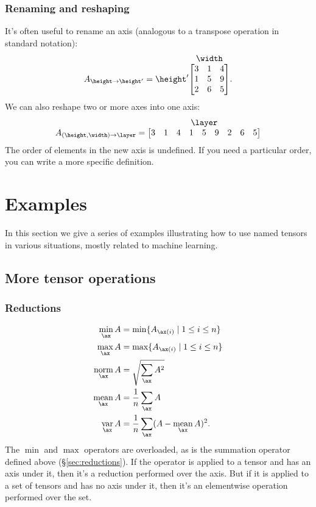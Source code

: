 \documentclass{article}
\makeatletter
\newcommand{\nmatrix}[3]{#1\begin{array}[b]{@{}c@{}}#2\\\begin{bmatrix}#3\end{bmatrix}\end{array}}
\makeatother
\begin{document}
\subsubsection{Renaming and reshaping}

It's often useful to rename an axis (analogous to a transpose operation in standard notation):
\begin{equation*}
A_{\height\rightarrow\height'} = \nmatrix{\height'}{\width}{
  3 & 1 & 4 \\
  1 & 5 & 9 \\
  2 & 6 & 5 \\
}.
\end{equation*}
We can also reshape two or more axes into one axis:
\begin{equation*}
  A_{(\height,\width)\rightarrow\layer} = \nmatrix{}{\layer}{
    3 & 1 & 4 & 1 & 5 & 9 & 2 & 6 & 5
  }
\end{equation*}
The order of elements in the new axis is undefined. If you need a particular order, you can write a more specific definition.

\section{Examples}
\label{sec:examples}

In this section we give a series of examples illustrating how to use named tensors in various situations, mostly related to machine learning.
\subsection{More tensor operations}

\subsubsection{Reductions}
\label{sec:morereductions}

\begin{align*}
  \nfun{\ax}{min} A &= \min \{A_{\ax(i)} \mid 1 \leq i \leq n\} \\
  \nfun{\ax}{max} A &= \max \{A_{\ax(i)} \mid 1 \leq i \leq n\} \\
  \nfun{\ax}{norm} A &= \sqrt{\nsum{\ax} A^2} \\
  \nfun{\ax}{mean} A &= \frac{1}{n} \nsum{\ax} A \\
  \nfun{\ax}{var} A &= \frac{1}{n} \nsum{\ax} (A - \nfun{\ax}{mean} A)^2.
\end{align*}
The $\min$ and $\max$ operators are overloaded, as is the summation operator defined above (\S\ref{sec:reductions}). If the operator is applied to a tensor and has an axis under it, then it's a reduction performed over the axis. But if it is applied to a set of tensors and has no axis under it, then it's an elementwise operation performed over the set.
\end{document}
